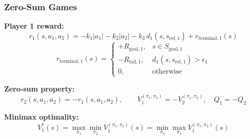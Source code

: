 \begin{frame}
  \frametitle{Zero-Sum Games}
  \normalsize

  \textbf{Player 1 reward:}
  \[
    r_1(s,a_1,a_2) = 
      -k_1|a_1| - k_2|a_2|
      -k_3\, d_1(s,s_{\text{ref},1})
      + r_{\text{terminal},1}(s)
  \]
\vspace{-0.2cm}
  \[
  r_{\text{terminal},1}(s) =
  \begin{cases}
    +R_{\text{goal},1}, & s \in S_{\text{goal},1} \\[2pt]
    -R_{\text{fail},1}, & d_1(s,s_{\text{ref},1}) > \epsilon_1 \\[2pt]
    0, & \text{otherwise}
  \end{cases}
  \]


  \textbf{Zero-sum property:}
  \[
    r_2(s,a_1,a_2) = -r_1(s,a_1,a_2), \qquad
    V_1^{(\pi_1,\pi_2)} = -V_2^{(\pi_1,\pi_2)}, \quad
    Q_1 = -Q_2
  \]

  \vspace{0.2cm}

  \textbf{Minimax optimality:}
  \[
    V_1^*(s) =
    \max_{\pi_1}\min_{\pi_2} V_1^{(\pi_1,\pi_2)}(s)
    = \min_{\pi_2}\max_{\pi_1} V_1^{(\pi_1,\pi_2)}(s)
  \]
\end{frame}







